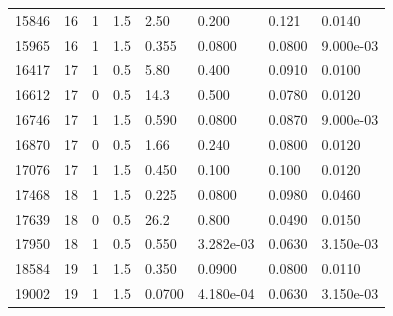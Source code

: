 \documentclass[preview]{standalone}
\begin{document}
{{{\begin{tabular}{L{1.2cm}C{1.2cm} C{0.3cm}C{0.5cm} C{1.4cm}C{1.4cm} C{1.4cm}C{1.4cm}}
  15846  &    16  & 1     & 1.5 &  2.50  & 0.200  & 0.121 &  0.0140   \\ 
  15965  &    16  & 1     & 1.5 &  0.355  & 0.0800  & 0.0800 &  9.000e-03   \\ 
  16417  &    17  & 1     & 0.5 &  5.80  & 0.400  & 0.0910 &  0.0100   \\ 
  16612  &    17  & 0     & 0.5 &  14.3  & 0.500  & 0.0780 &  0.0120   \\ 
  16746  &    17  & 1     & 1.5 &  0.590  & 0.0800  & 0.0870 &  9.000e-03   \\ 
  16870  &    17  & 0     & 0.5 &  1.66  & 0.240  & 0.0800 &  0.0120   \\ 
  17076  &    17  & 1     & 1.5 &  0.450  & 0.100  & 0.100 &  0.0120   \\ 
  17468  &    18  & 1     & 1.5 &  0.225  & 0.0800  & 0.0980 &  0.0460   \\ 
  17639  &    18  & 0     & 0.5 &  26.2  & 0.800  & 0.0490 &  0.0150   \\ 
  17950  &    18  & 1     & 0.5 &  0.550  & 3.282e-03  & 0.0630 &  3.150e-03   \\ 
  18584  &    19  & 1     & 1.5 &  0.350  & 0.0900  & 0.0800 &  0.0110   \\ 
  19002  &    19  & 1     & 1.5 &  0.0700  & 4.180e-04  & 0.0630 &  3.150e-03   \\ 
\hline 
\end{tabular} 

}}}
\end{document}
